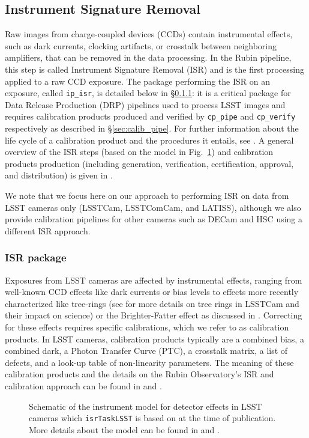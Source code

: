 \subsection{Instrument Signature Removal}
\label{sec:isr}

Raw images from charge-coupled devices (CCDs) contain instrumental effects, such as dark currents, clocking artifacts, or crosstalk between neighboring amplifiers, that can be removed in the data processing.
In the Rubin pipeline, this step is called Instrument Signature Removal (ISR) and is the first processing applied to a raw CCD exposure.
The package performing the ISR on an exposure, called \texttt{ip\_isr}, is detailed below in \S\ref{sec:ip_isr}: it is a critical package for Data Release Production (DRP) pipelines used to process LSST images and requires calibration products produced and verified by \texttt{cp\_pipe} and \texttt{cp\_verify} respectively as described in \S\ref{sec:calib_pipe}.
For further information about the life cycle of a calibration product and the procedures it entails, see \citet{DMTN-222}.
A general overview of the ISR steps (based on the model in Fig.~\ref{fig:isr_model}) and calibration products production (including generation, verification, certification, approval, and distribution) is given in \citet{2024arXiv240414516P}.

We note that we focus here on our approach to performing ISR on data from LSST cameras only (LSSTCam, LSSTComCam, and LATISS), although we also provide calibration pipelines for other cameras such as DECam and HSC using a different ISR approach.

\subsubsection{ISR package}
\label{sec:ip_isr}

Exposures from LSST cameras are affected by instrumental effects, ranging from well-known CCD effects like dark currents or bias levels to effects more recently characterized like tree-rings (see \citet{2017JInst..12C5015P,2020JATIS...6a1005P,2023PASP..135k5003E,2015JInst..10C8010O,2016ApJ...825...61O} for more details on tree rings in LSSTCam and their impact on science) or the Brighter-Fatter effect as discussed in \citet{2024PASP..136d5003B}.
Correcting for these effects requires specific calibrations, which we refer to as calibration products.
In LSST cameras, calibration products typically are a combined bias, a combined dark, a Photon Transfer Curve (PTC), a crosstalk matrix, a list of defects, and a look-up table of non-linearity parameters.
The meaning of these calibration products and the details on the Rubin Observatory's ISR and calibration approach can be found in \citet{2024arXiv240414516P} and \citet{SITCOMTN-086}.
\begin{figure}
    \caption{Schematic of the instrument model for detector effects in LSST cameras which \texttt{isrTaskLSST} is based on at the time of publication.
    More details about the model can be found in \citet{SITCOMTN-086} and \citet{ 2024arXiv240414516P}.}
    \label{fig:isr_model}
\end{figure}

